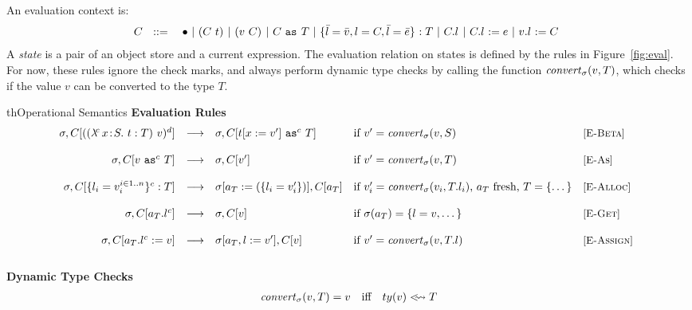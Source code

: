 \documentclass{article}
\newcommand{\fun}[1]{\mbox{\it #1\/}}
\newcommand{\safe}{\bullet}
\newcommand{\lam}[5]{\lambda\!^{#1}\,#2\!:\!#3.\,\,#5:#4}
\newcommand{\app}[3]{(#2~#3)^{#1}}
\newcommand{\hole}{\safe}
\newcommand{\App}[2]{#1[#2]}
\newcommand{\cast}[3]{#2~\t{as}^{#1}~#3}
\newcommand{\comsubtype}[2]{#1 <\!\!\leadsto #2}
\newcommand{\convert}[2]{{#1}\convertword{#2}}
\newcommand{\convertword}{\mbox{\,\,$\sim :$\,\,}}
\renewcommand{\t}[1]{{\tt #1}}
\newcommand{\red}[0]{\longrightarrow}  %
\newcommand{\lred}[0]{\red}  %
\newcommand{\objty}[1]{\{#1\}}
\newcommand{\obje}[3]{\{#2\}^{#1}:{#3}}
\newcommand{\objv}[1]{\{#1\}}
\newcommand{\objget}[3]{#2.#3^{#1}}
\newcommand{\objset}[4]{#2.#3^{#1}:=#4}
\newcommand{\wrap}[2]{#1~\t{wrap}~#2}
\newcommand{\allocty}[1]{ty(#1)}
\renewcommand{\convert}[2]{\fun{convert}_{\sigma}(#1,#2)}
\newcommand{\istype}[2]{#1~\t{is}_{\sigma}~ #2}
\begin{document}
An evaluation context is:
\[
C ~~::=
\begin{array}[t]{@{}l}
		~~~\hole
	~|~	\app{}{C}{t} 
	~|~	\app{}{v}{C}
	~|~ \cast{}{C}{T} 
	~|~ \obje{}{\bar l=\bar v,l=C, \bar l =\bar e}{T}
	~|~ \objget{}{C}{l}
	~|~ \objset{}{C}{l}{e}
	~|~ \objset{}{v}{l}{C} 
\end{array}
\]
A \emph{state} is a pair of an object store and a current expression.
The evaluation relation on states is defined by the rules in Figure~\ref{fig:eval}.
For now, these rules ignore the check marks, and always perform dynamic type checks by calling the function $\convert{v}{T}$, which checks if the value $v$ can be converted to the type $T$. 

\begin{displayfigure}{th}{Operational Semantics}
\label{fig:eval} 
\label{fig:convert} 
\footnotesize
{\bf Evaluation Rules}
\[
\begin{array}{@{}rclll}
	\sigma,C[{\app{d}{(\lam{c}{x}{S}{T}{t})}{v}}]
	&\lred&
	\sigma,C[\cast{c}{t[x:=v']}{T}]
	&\mbox{if $v'=\convert v S$}
	&\rel{E-Beta}
\\~\\
	\sigma,C[\cast{c}{v}{T}]
	&\lred&
	\sigma,C[v']
	&\mbox{if $v'=\convert v T$}
	&\rel{E-As}
\\~\\
	\sigma,C[\obje{c}{l_i=v_i^{i\in 1..n}}{T}]
	&\lred&
	\sigma[a_T:=(\objv{l_i=v'_i})],C[a_T] 
	&\mbox{if $v_i'=\convert{v_i}{T.l_i}$, $a_T$ fresh, $T=\objty{\dots}$}
	&\rel{E-Alloc} 
\\~\\
	\sigma,C[\objget{c}{a_T}{l}]
	&\lred&
	\sigma,C[v]
	&\mbox{if $\sigma(a_T)=\objv{l=v,\dots}$}
	&\rel{E-Get}
\\~\\
	\sigma,C[\objset{c}{a_T}{l}{v}]
	&\lred&
	\sigma[a_T,l:=v'],C[v] 
	&\mbox{if $v'=\convert v {T.l}$}
	&\rel{E-Assign} 
\\~\\
\end{array}
\]
{\bf Dynamic Type Checks}
\[
\begin{array}{rcl}
	\convert{v}{T} = v &\mbox{iff}&%
	 \mbox{$\comsubtype{\allocty v}{T}$} \\
\end{array}
\]
 \end{displayfigure} 
\end{document}

